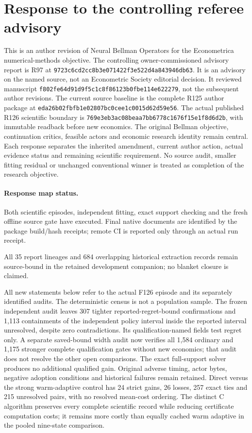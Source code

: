 \section*{Response to the controlling referee advisory}
\label{sec:response126}
This is an author revision of Neural Bellman Operators for the Econometrica numerical-methods objective. The controlling owner-commissioned advisory report is R97 at \nolinkurl{9723c6cd2cc8b3e071422f3e522d4a843946db63}. It is an advisory on the named source, not an Econometric Society editorial decision. It reviewed manuscript \nolinkurl{f802fe64d91d9f5c1c8f86123b0fbe114e622279}, not the subsequent author revisions. The current source baseline is the complete R125 author package at \nolinkurl{eda26b02fbfb1e02807bc0cee1c0015d62d59e56}. The actual published R126 scientific boundary is \nolinkurl{769e3eb3ac08beaa7bb6778c1676f15e1f8d6d2b}, with immutable readback before new economics. The original Bellman objective, continuation critics, feasible actors and economic research identity remain central. Each response separates the inherited amendment, current author action, actual evidence status and remaining scientific requirement. No source audit, smaller fitting residual or unchanged conventional winner is treated as completion of the research objective.

\paragraph{Response map status.} Both scientific episodes, independent fitting, exact support checking and the fresh offline source gate have executed. Final native documents are identified by the package build/hash receipts; remote CI is reported only through an actual run receipt.

All 35 report lineages and 684 overlapping historical extraction records remain source-bound in the retained development companion; no blanket closure is claimed.

All new statements below refer to the actual F126 episode and its separately identified audits. The deterministic census is not a population sample. The frozen independent audit leaves 307 tighter reported-regret-bound confirmations and 1,113 containments of the independent policy interval inside the reported interval unresolved, despite zero contradictions. Its qualification-named fields test regret only. A separate saved-bound width audit now verifies all 1,584 ordinary and 1,175 stronger complete qualification gates without new economics; that audit does not resolve the other open comparisons. The exact full-support solver produces no additional qualified gain. Original adverse timing, actor bytes, negative adoption conditions and historical failures remain retained. Direct versus the strong warm-adaptive control has 24 strict gains, 26 losses, 257 exact ties and 215 unresolved pairs, with no resolved mean-cost ordering. The distinct C algorithm preserves every complete scientific record while reducing certificate computation costs; it remains more costly than equally cached warm adaptive in the pooled nine-state comparison.

